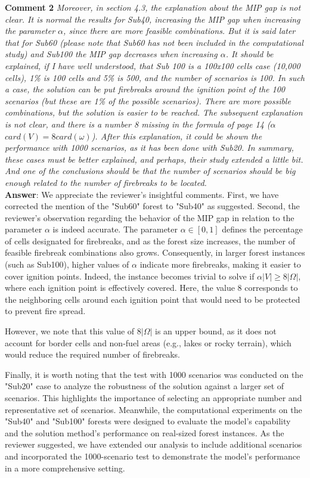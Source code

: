 \documentclass[12pt]{article}
\begin{document}
\noindent \textbf{Comment 2} \textit{Moreover, in section 4.3, the explanation about the MIP gap is not clear. It is normal the results for Sub40, increasing the MIP gap when increasing the parameter $\alpha$, since there are more feasible combinations. But it is said later that for Sub60 (please note that Sub60 has not been included in the computational study) and Sub100 the MIP gap decreases when increasing $\alpha$. It should be explained, if I have well understood, that Sub 100 is a 100x100 cells case (10,000 cells), 1\% is 100 cells and 5\% is 500, and the number of scenarios is 100. In such a case, the solution can be put firebreaks around the ignition point of the 100 scenarios (but these are 1\% of the possible scenarios). There are more possible combinations, but the solution is easier to be reached. The subsequent explanation is not clear, and there is a number 8 missing in the formula of page 14 ($\alpha$ $card(V)=8 card(\omega)$). After this explanation, it could be shown the performance with 1000 scenarios, as it has been done with Sub20.
In summary, these cases must be better explained, and perhaps, their study extended a little bit. And one of the conclusions should be that the number of scenarios should be big enough related to the number of firebreaks to be located.} \\

\textbf{Answer}: We appreciate the reviewer’s insightful comments. First, we have corrected the mention of the "Sub60" forest to "Sub40" as suggested. Second, the reviewer’s observation regarding the behavior of the MIP gap in relation to the parameter $\alpha$ is indeed accurate. The parameter $\alpha \in [0,1]$ defines the percentage of cells designated for firebreaks, and as the forest size increases, the number of feasible firebreak combinations also grows. Consequently, in larger forest instances (such as Sub100), higher values of $\alpha$ indicate more firebreaks, making it easier to cover ignition points. Indeed, the instance becomes trivial to solve if $\alpha |V| \geq 8|\Omega|$, where each ignition point is effectively covered. Here, the value 8 corresponds to the neighboring cells around each ignition point that would need to be protected to prevent fire spread. 

However, we note that this value of $8|\Omega|$ is an upper bound, as it does not account for border cells and non-fuel areas (e.g., lakes or rocky terrain), which would reduce the required number of firebreaks. 

Finally, it is worth noting that the test with 1000 scenarios was conducted on the "Sub20" case to analyze the robustness of the solution against a larger set of scenarios. This highlights the importance of selecting an appropriate number and representative set of scenarios. Meanwhile, the computational experiments on the "Sub40" and "Sub100" forests were designed to evaluate the model’s capability and the solution method’s performance on real-sized forest instances. As the reviewer suggested, we have extended our analysis to include additional scenarios and incorporated the 1000-scenario test to demonstrate the model's performance in a more comprehensive setting. \\
    
\end{document}
